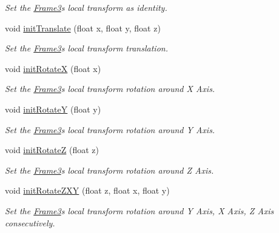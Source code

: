 \begin{DoxyCompactItemize}
\begin{DoxyCompactList}\small\item\em Set the \hyperlink{class_i_dream_sky_1_1_frame3}{Frame3}\textquotesingle{}s local transform as identity. \end{DoxyCompactList}\item 
void \hyperlink{class_i_dream_sky_1_1_frame3_ad4a2ee8f4ba31539809e9b1c78c179a0}{init\+Translate} (float x, float y, float z)
\begin{DoxyCompactList}\small\item\em Set the \hyperlink{class_i_dream_sky_1_1_frame3}{Frame3}\textquotesingle{}s local transform translation. \end{DoxyCompactList}\item 
void \hyperlink{class_i_dream_sky_1_1_frame3_a7ab1794685e58d63039f209b75e81911}{init\+RotateX} (float x)
\begin{DoxyCompactList}\small\item\em Set the \hyperlink{class_i_dream_sky_1_1_frame3}{Frame3}\textquotesingle{}s local transform rotation around X Axis. \end{DoxyCompactList}\item 
void \hyperlink{class_i_dream_sky_1_1_frame3_a2f2ca26808ee2a9e1adb225fefc4c6f5}{init\+RotateY} (float y)
\begin{DoxyCompactList}\small\item\em Set the \hyperlink{class_i_dream_sky_1_1_frame3}{Frame3}\textquotesingle{}s local transform rotation around Y Axis. \end{DoxyCompactList}\item 
void \hyperlink{class_i_dream_sky_1_1_frame3_a383554882baf298d04a135357f37a8e3}{init\+RotateZ} (float z)
\begin{DoxyCompactList}\small\item\em Set the \hyperlink{class_i_dream_sky_1_1_frame3}{Frame3}\textquotesingle{}s local transform rotation around Z Axis. \end{DoxyCompactList}\item 
void \hyperlink{class_i_dream_sky_1_1_frame3_a387d816bf2388f018f2f482845c9da3c}{init\+Rotate\+Z\+XY} (float z, float x, float y)
\begin{DoxyCompactList}\small\item\em Set the \hyperlink{class_i_dream_sky_1_1_frame3}{Frame3}\textquotesingle{}s local transform rotation around Y Axis, X Axis, Z Axis consecutively. \end{DoxyCompactList}\item 

\end{DoxyCompactItemize}
